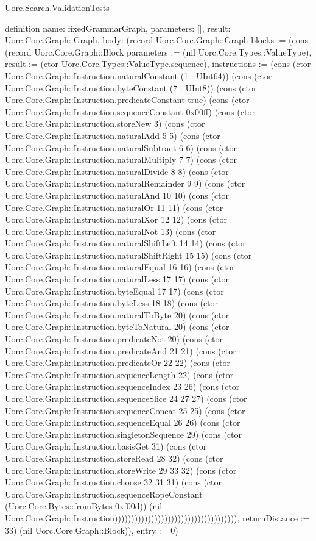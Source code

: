 \begin{lexlean}{Uorc.Search.ValidationTests}
\begin{semanticmodule}
definition{
  name: fixedGrammarGraph,
  parameters: [],
  result: Uorc.Core.Graph::Graph,
  body: (record Uorc.Core.Graph::Graph {blocks := (cons (record Uorc.Core.Graph::Block {parameters := (nil Uorc.Core.Types::ValueType), result := (ctor Uorc.Core.Types::ValueType.sequence), instructions := (cons (ctor Uorc.Core.Graph::Instruction.naturalConstant (1 : UInt64)) (cons (ctor Uorc.Core.Graph::Instruction.byteConstant (7 : UInt8)) (cons (ctor Uorc.Core.Graph::Instruction.predicateConstant true) (cons (ctor Uorc.Core.Graph::Instruction.sequenceConstant 0x00ff) (cons (ctor Uorc.Core.Graph::Instruction.storeNew 3) (cons (ctor Uorc.Core.Graph::Instruction.naturalAdd 5 5) (cons (ctor Uorc.Core.Graph::Instruction.naturalSubtract 6 6) (cons (ctor Uorc.Core.Graph::Instruction.naturalMultiply 7 7) (cons (ctor Uorc.Core.Graph::Instruction.naturalDivide 8 8) (cons (ctor Uorc.Core.Graph::Instruction.naturalRemainder 9 9) (cons (ctor Uorc.Core.Graph::Instruction.naturalAnd 10 10) (cons (ctor Uorc.Core.Graph::Instruction.naturalOr 11 11) (cons (ctor Uorc.Core.Graph::Instruction.naturalXor 12 12) (cons (ctor Uorc.Core.Graph::Instruction.naturalNot 13) (cons (ctor Uorc.Core.Graph::Instruction.naturalShiftLeft 14 14) (cons (ctor Uorc.Core.Graph::Instruction.naturalShiftRight 15 15) (cons (ctor Uorc.Core.Graph::Instruction.naturalEqual 16 16) (cons (ctor Uorc.Core.Graph::Instruction.naturalLess 17 17) (cons (ctor Uorc.Core.Graph::Instruction.byteEqual 17 17) (cons (ctor Uorc.Core.Graph::Instruction.byteLess 18 18) (cons (ctor Uorc.Core.Graph::Instruction.naturalToByte 20) (cons (ctor Uorc.Core.Graph::Instruction.byteToNatural 20) (cons (ctor Uorc.Core.Graph::Instruction.predicateNot 20) (cons (ctor Uorc.Core.Graph::Instruction.predicateAnd 21 21) (cons (ctor Uorc.Core.Graph::Instruction.predicateOr 22 22) (cons (ctor Uorc.Core.Graph::Instruction.sequenceLength 22) (cons (ctor Uorc.Core.Graph::Instruction.sequenceIndex 23 26) (cons (ctor Uorc.Core.Graph::Instruction.sequenceSlice 24 27 27) (cons (ctor Uorc.Core.Graph::Instruction.sequenceConcat 25 25) (cons (ctor Uorc.Core.Graph::Instruction.sequenceEqual 26 26) (cons (ctor Uorc.Core.Graph::Instruction.singletonSequence 29) (cons (ctor Uorc.Core.Graph::Instruction.basisGet 31) (cons (ctor Uorc.Core.Graph::Instruction.storeRead 28 32) (cons (ctor Uorc.Core.Graph::Instruction.storeWrite 29 33 32) (cons (ctor Uorc.Core.Graph::Instruction.choose 32 31 31) (cons (ctor Uorc.Core.Graph::Instruction.sequenceRopeConstant (Uorc.Core.Bytes::fromBytes 0xf00d)) (nil Uorc.Core.Graph::Instruction))))))))))))))))))))))))))))))))))))), returnDistance := 33}) (nil Uorc.Core.Graph::Block)), entry := 0})
}


\end{semanticmodule}
\end{lexlean}
